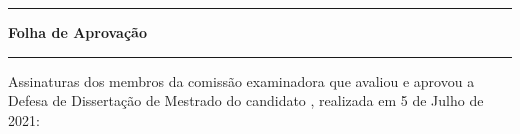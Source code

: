 \begin{folhadeaprovacao}
   \noindent\begin{minipage}{\textwidth}
      \begin{center}
      \rule{\linewidth}{1pt}
      \textbf{Folha de Aprovação}\\[-0.5em]
      \rule{\linewidth}{1pt}
      \end{center}
   \end{minipage}

   \begin{flushleft}
      Assinaturas dos membros da comissão examinadora que avaliou e aprovou a
      Defesa de Dissertação de Mestrado do candidato \imprimirautor{}, realizada
      em 5 de Julho de 2021:
   \end{flushleft}
 
   
       
   \vspace*{\fill}
   \begin{center}
      \vspace*{0.5cm}
      {\large\imprimirlocal}
      \par
      {\large\imprimirdata}
      \vspace*{1cm}
   \end{center}
\end{folhadeaprovacao}


